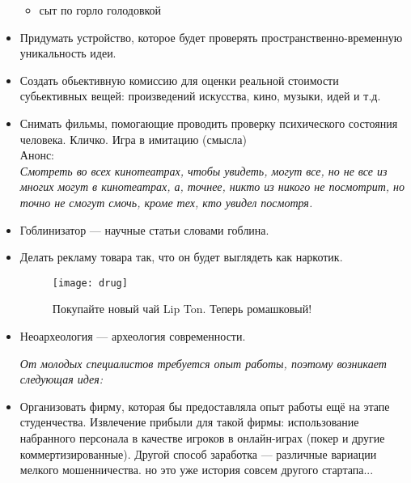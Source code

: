 \begin{itemize}
\begin{itemize}
            \item сыт по горло голодовкой
        \end{itemize}
    \item Придумать устройство, которое будет проверять пространственно-временную уникальность идеи.
    \item Создать обьективную комиссию для оценки реальной стоимости субьективных вещей: произведений искусства, кино, музыки, идей и т.д.
    \item Снимать фильмы, помогающие проводить проверку психического состояния человека.
    Кличко. Игра в имитацию (смысла) \\
    Анонс:\\
    \emph{Смотреть во всех кинотеатрах, чтобы увидеть, могут все, но не все из многих могут в кинотеатрах, а, точнее, никто из никого не посмотрит, но точно не смогут смочь, кроме тех, кто увидел посмотря.}
    \item Гоблинизатор --- научные статьи словами гоблина.
    \item Делать рекламу товара так, что он будет выглядеть как наркотик.

    \begin{figure}[ht!]
        \centering
        \texttt{[image: drug]}
        \caption{Покупайте новый чай Lip Ton. Теперь ромашковый!}
    \end{figure}
    
    \item Неоархеология --- археология современности.
    
    \emph{От молодых специалистов требуется опыт работы, поэтому возникает следующая идея:}
    \item Организовать фирму, которая бы предоставляла опыт работы ещё на этапе студенчества. Извлечение прибыли для такой фирмы: использование набранного персонала в качестве игроков в онлайн-играх (покер и другие коммертизированные). Другой способ заработка --- различные вариации мелкого мошенничества. но это уже история совсем другого стартапа... 
\end{itemize}
